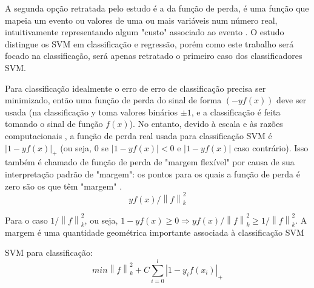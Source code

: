 A segunda opção retratada pelo estudo \cite{evgeniou1999support} é a da função de perda, é uma função que mapeia um evento ou valores de uma ou mais variáveis num número real, intuitivamente representando algum "custo" associado ao evento \cite{wald1950statistical}. O estudo \cite{evgeniou1999support} distingue os SVM em classificação e regressão, porém como este trabalho será focado na classificação, será apenas retratado o primeiro caso dos classificadores SVM.

Para classificação idealmente o erro de erro de classificação precisa ser minimizado, então uma função de perda do sinal de forma $ (-yf(x)) $ deve ser usada (na classificação y toma valores binários $ \pm1 $, e a classificação é feita tomando o sinal de função $ f(x) $). No entanto, devido à escala e às razões computacionais \cite{vapnik1998statistical}, a função de perda real usada para classificação SVM é $ |1-yf(x)|_{+} $ (ou seja, 0 se $ |1-yf(x)|< 0 $ e $ |1-yf(x)| $ caso contrário). Isso também é chamado de função de perda de "margem flexível" por causa de sua interpretação padrão de "margem": os pontos para os quais a função de perda é zero são os que têm "margem" \cite{evgeniou1999support}.\[yf(x)/\left \| f \right \|_{k}^{2}\]

Para o caso $ 1/\left \| f \right \|_{k}^{2} $, ou seja, $1-yf(x) \geq  0 \Rightarrow yf(x)/\left \| f \right \|_{k}^{2} \geq 1/\left \| f \right \|_{k}^{2} $. A margem é uma quantidade geométrica importante associada à classificação SVM \cite{evgeniou1999support}

SVM para classificação:
\[min\left \| f \right \|_{k}^{2}+C\sum_{i=0}^{l}\left | 1-y_{i}f(x_{i})\right |_{+}\]
